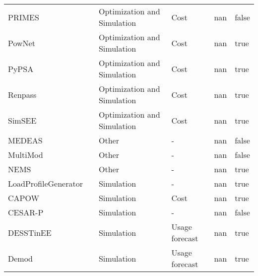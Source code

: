 \begin{tabular}{llllrl}
PRIMES   &  \cite{antoniou_decision_1999}  &  Optimization  and Simulation   &  Cost  & nan &  false   \\
PowNet   &  \cite{chowdhury_pownet_2020}  &  Optimization  and Simulation   &  Cost  & nan &  true   \\
PyPSA   &  \cite{brown_pypsa_2018}  &  Optimization  and Simulation   &  Cost  & nan &  true   \\
Renpass   &  \cite{frauke_wiese_renpass_2015}  &  Optimization  and Simulation   &  Cost  & nan &  true   \\
SimSEE   &  \cite{chaer_simulacion_2008}  &  Optimization  and Simulation   &  Cost  & nan &  true   \\
MEDEAS   &  \cite{capellan-perez_medeas_2020}  &  Other   &  -  & nan &  false   \\
MultiMod   &  \cite{huppmann_market_2014}  &  Other   &  -  & nan &  false   \\
NEMS   &  \cite{nalley_national_2019}  &  Other   &  -  & nan &  true   \\
LoadProfileGenerator   &  \cite{pflugradt_modelling_2016}  &  Simulation  &  -  & nan &  true   \\
CAPOW   &  \cite{su_open_2020}  &  Simulation   &  Cost  & nan &  true   \\
CESAR-P  &  \cite{leoniefierz_hues-platformcesar-p-core_2021}  &  Simulation   &  -  & nan &  false   \\
DESSTinEE  &  \cite{bosmann_shape_2015}  &  Simulation   &  Usage forecast  & nan &  true   \\
Demod  &  \cite{barsanti_socio-technical_2021}  &  Simulation   &  Usage forecast  & nan &  true   \\

\end{tabular}
